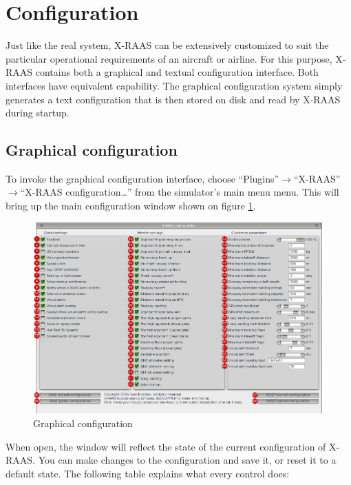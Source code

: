 \documentclass[a4paper,12pt]{article}
\begin{document}
\section{Configuration}
\label{sec:Configuration}

Just like the real system, X-RAAS can be extensively customized to suit
the particular operational requirements of an aircraft or airline. For
this purpose, X-RAAS contains both a graphical and textual configuration
interface. Both interfaces have equivalent capability. The graphical
configuration system simply generates a text configuration that is then
stored on disk and read by X-RAAS during startup.

\subsection{Graphical configuration}
\label{subsec:GUIConfiguration}

To invoke the graphical configuration interface, choose
``Plugins''$\rightarrow$``X-RAAS''$\rightarrow$``X-RAAS configuration\ldots''
from the simulator's main menu menu. This will bring up the main
configuration window shown on figure \ref{GUIConfigurationWindow}.

\begin{figure}[H]
\vspace{.5em}
\begin{center}
\includegraphics[width=\textwidth]{../src/config_window_annotated.png}
\end{center}
\caption{Graphical configuration}
\label{GUIConfigurationWindow}
\end{figure}

When open, the window will reflect the state of the current configuration
of X-RAAS. You can make changes to the configuration and save it, or
reset it to a default state. The following table explains what every
control does:
\end{document}
